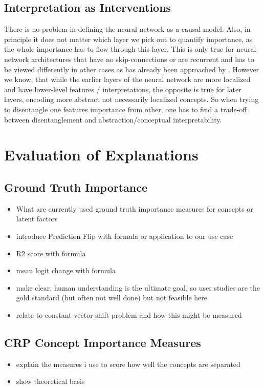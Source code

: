 \subsection{Interpretation as Interventions}
There is no problem in defining the neural network as a causal model. 
Also, in principle it does not matter which layer we pick out to quantify importance, as the whole importance has to flow through this layer. This is only true for neural network architectures that have no skip-connections or are recurrent and has to be viewed differently in other cases as has already been approached by \cite{Chattopadhyay2019}. However we know, that while the earlier layers of the neural network are more localized and have lower-level features / interpretations, the opposite is true for later layers, encoding more abstract not necessarily localized concepts. 
So when trying to disentangle one features importance from other, one has to find a trade-off between disentanglement and abstraction/conceptual interpretability.
 


\section{Evaluation of Explanations}
\subsection{Ground Truth Importance}
\begin{itemize}
    \item What are currently used ground truth importance measures for concepts or latent factors
    \item introduce Prediction Flip with formula or application to our use case
    \item R2 score with formula \cite{Sixt2020}
    \item mean logit change with formula
    \item make clear: human understanding is the ultimate goal, so user studies are the gold standard (but often not well done) but not feasible here
    \item relate to constant vector shift problem and how this might be measured
\end{itemize}
\subsection{CRP Concept Importance Measures}
\begin{itemize}
    \item explain the measures i use to score how well the concepts are separated
    \item show theoretical basis
\end{itemize}

